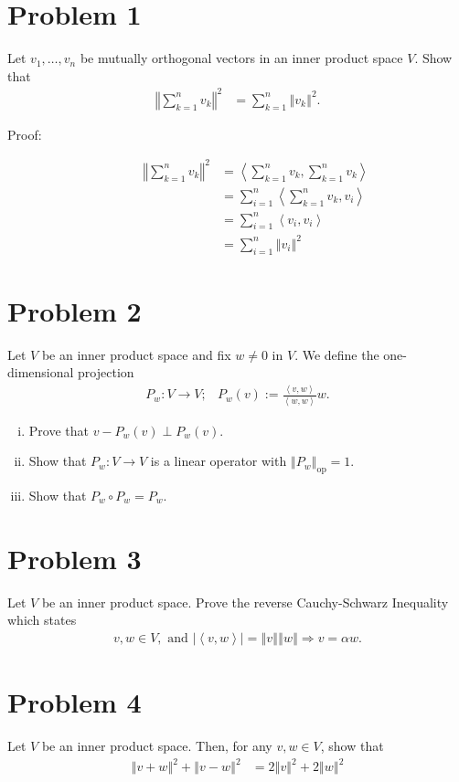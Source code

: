 \documentclass[10pt]{extarticle}
\title{}
\author{}
\date{}
\newcommand{\iprod}[2]{\left\langle #1,#2\right\rangle}
\newcommand{\norm}[1]{\left\Vert #1\right\Vert}
\begin{document}
  \section{Problem 1}%
  Let $v_1,\dots,v_n$ be mutually orthogonal vectors in an inner product space $V$. Show that
  \begin{align*}
    \norm{\sum_{k=1}^{n}v_k}^2 &= \sum_{k=1}^{n}\norm{v_k}^2.
  \end{align*}
  \begin{description}
    \item[Proof:]
      \begin{align*}
        \norm{\sum_{k=1}^{n}v_k}^2 &=\iprod{\sum_{k=1}^{n}v_k}{\sum_{k=1}^{n}v_k} \\
                                   &= \sum_{i=1}^{n}\iprod{\sum_{k=1}^{n}v_k}{v_i}\\
                                   &= \sum_{i=1}^{n}\iprod{v_i}{v_i}\tag*{since for $i\neq j$, $\iprod{v_i}{v_j} = 0$}\\
                                   &= \sum_{i=1}^{n}\norm{v_i}^2
      \end{align*}
  \end{description}
  \section{Problem 2}%
  Let $V$ be an inner product space and fix $w\neq 0$ in $V$. We define the one-dimensional projection
  \begin{align*}
    P_w: V\rightarrow V;&P_w(v) := \frac{\iprod{v}{w}}{\iprod{w}{w}}w.
  \end{align*}
  \begin{enumerate}[(i)]
    \item Prove that $v-P_w(v)\perp P_w(v)$.
    \item Show that $P_w:V\rightarrow V$ is a linear operator with $\norm{P_w}_{\text{op}} = 1$.
    \item Show that $P_w\circ P_w = P_w$.
  \end{enumerate}
  \section{Problem 3}%
  Let $V$ be an inner product space. Prove the reverse Cauchy-Schwarz Inequality which states
  \begin{align*}
    v,w\in V,\text{ and } |\iprod{v}{w}| = \norm{v}\norm{w} \Rightarrow v = \alpha w.
  \end{align*}
  \section{Problem 4}%
    Let $V$ be an inner product space. Then, for any $v,w\in V$, show that
    \begin{align*}
      \norm{v+w}^2 + \norm{v-w}^2 &= 2\norm{v}^2 + 2\norm{w}^2
    \end{align*}
\end{document}
